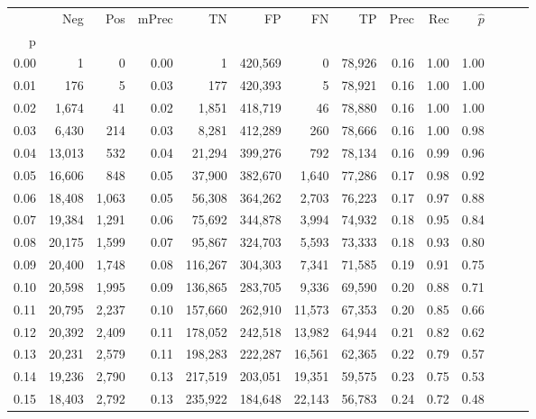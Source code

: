 \begin{tabular}{rrrrrrrrrrrrrr}
\toprule
{} &     Neg &    Pos & mPrec &       TN &       FP &      FN &      TP &  Prec &   Rec & $\hat{p}$ \\
p    &         &        &       &          &          &         &         &       &       &           \\
\midrule
0.00 &       1 &      0 &  0.00 &        1 &  420,569 &       0 &  78,926 &  0.16 &  1.00 &      1.00 \\
0.01 &     176 &      5 &  0.03 &      177 &  420,393 &       5 &  78,921 &  0.16 &  1.00 &      1.00 \\
0.02 &   1,674 &     41 &  0.02 &    1,851 &  418,719 &      46 &  78,880 &  0.16 &  1.00 &      1.00 \\
0.03 &   6,430 &    214 &  0.03 &    8,281 &  412,289 &     260 &  78,666 &  0.16 &  1.00 &      0.98 \\
0.04 &  13,013 &    532 &  0.04 &   21,294 &  399,276 &     792 &  78,134 &  0.16 &  0.99 &      0.96 \\
0.05 &  16,606 &    848 &  0.05 &   37,900 &  382,670 &   1,640 &  77,286 &  0.17 &  0.98 &      0.92 \\
0.06 &  18,408 &  1,063 &  0.05 &   56,308 &  364,262 &   2,703 &  76,223 &  0.17 &  0.97 &      0.88 \\
0.07 &  19,384 &  1,291 &  0.06 &   75,692 &  344,878 &   3,994 &  74,932 &  0.18 &  0.95 &      0.84 \\
0.08 &  20,175 &  1,599 &  0.07 &   95,867 &  324,703 &   5,593 &  73,333 &  0.18 &  0.93 &      0.80 \\
0.09 &  20,400 &  1,748 &  0.08 &  116,267 &  304,303 &   7,341 &  71,585 &  0.19 &  0.91 &      0.75 \\
0.10 &  20,598 &  1,995 &  0.09 &  136,865 &  283,705 &   9,336 &  69,590 &  0.20 &  0.88 &      0.71 \\
0.11 &  20,795 &  2,237 &  0.10 &  157,660 &  262,910 &  11,573 &  67,353 &  0.20 &  0.85 &      0.66 \\
0.12 &  20,392 &  2,409 &  0.11 &  178,052 &  242,518 &  13,982 &  64,944 &  0.21 &  0.82 &      0.62 \\
0.13 &  20,231 &  2,579 &  0.11 &  198,283 &  222,287 &  16,561 &  62,365 &  0.22 &  0.79 &      0.57 \\
0.14 &  19,236 &  2,790 &  0.13 &  217,519 &  203,051 &  19,351 &  59,575 &  0.23 &  0.75 &      0.53 \\
0.15 &  18,403 &  2,792 &  0.13 &  235,922 &  184,648 &  22,143 &  56,783 &  0.24 &  0.72 &      0.48 \\

\end{tabular}
